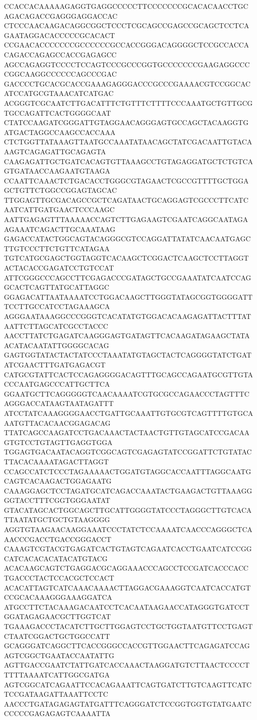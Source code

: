 CCACCACAAAAAGAGGTGAGGCCCCCTTCCCCCCCGCACACAACCTGCAGACAGACCGAGGGAGGACCAC
CTCCCAACAAGACAGGCGGCTCCCTCGCAGCCGAGCCGCAGCTCCTCAGAATAGGACACCCCCGCACACT
CCGAACACCCCCCCGCCCCCCGCCACCGGGACAGGGGCTCCGCCACCACAGACCAGAGCCACCGAGAGCC
AGCCAGAGGTCCCCTCCAGTCCCGCCCGGTGCCCCCCCGAAGAGGCCCCGGCAAGGCCCCCCAGCCCGAC
GACCCCTGCACGCACCGAAAGAGGGACCCGCCCGAAAACGTCCGGCACATCCATGCGTAAACATCATGAC
ACGGGTCGCAATCTTGACATTTCTGTTTCTTTTCCCAAATGCTGTTGCGTGCCAGATTCACTGGGGCAAT
CTATCCAAGATCGGGATTGTAGGAACAGGGAGTGCCAGCTACAAGGTGATGACTAGGCCAAGCCACCAAA
CTCTGGTTATAAAGTTAATGCCAAATATAACAGCTATCGACAATTGTACAAAGTCAGAGATTGCAGAGTA
CAAGAGATTGCTGATCACAGTGTTAAAGCCTGTAGAGGATGCTCTGTCAGTGATAACCAAGAATGTAAGA
CCAATTCAAACTCTGACACCTGGGCGTAGAACTCGCCGTTTTGCTGGAGCTGTTCTGGCCGGAGTAGCAC
TTGGAGTTGCGACAGCCGCTCAGATAACTGCAGGAGTCGCCCTTCATCAATCATTGATGAACTCCCAAGC
AATTGAGAGTTTAAAAACCAGTCTTGAGAAGTCGAATCAGGCAATAGAAGAAATCAGACTTGCAAATAAG
GAGACCATACTGGCAGTACAGGGCGTCCAGGATTATATCAACAATGAGCTTGTCCCTTCTGTTCATAGAA
TGTCATGCGAGCTGGTAGGTCACAAGCTCGGACTCAAGCTCCTTAGGTACTACACCGAGATCCTGTCCAT
ATTCGGGCCCAGCCTTCGAGACCCGATAGCTGCCGAAATATCAATCCAGGCACTCAGTTATGCATTAGGC
GGAGACATTAATAAAATCCTGGACAAGCTTGGGTATAGCGGTGGGGATTTCCTTGCCATCCTAGAAAGCA
AGGGAATAAAGGCCCGGGTCACATATGTGGACACAAGAGATTACTTTATAATTCTTAGCATCGCCTACCC
AACCTTATCTGAGATCAAGGGAGTGATAGTTCACAAGATAGAAGCTATAACATACAATATTGGGGCACAG
GAGTGGTATACTACTATCCCTAAATATGTAGCTACTCAGGGGTATCTGATATCGAACTTTGATGAGACGT
CATGCGTATTCACTCCAGAGGGGACAGTTTGCAGCCAGAATGCGTTGTACCCAATGAGCCCATTGCTTCA
GGAATGCTTCAGGGGGTCAACAAAATCGTGCGCCAGAACCCTAGTTTCAGGGACCATAAGTAATAGATTT
ATCCTATCAAAGGGGAACCTGATTGCAAATTGTGCGTCAGTTTTGTGCAAATGTTACACAACGGAGACAG
TTATCAGCCAAGATCCTGACAAACTACTAACTGTTGTAGCATCCGACAAGTGTCCTGTAGTTGAGGTGGA
TGGAGTGACAATACAGGTCGGCAGTCGAGAGTATCCGGATTCTGTATACTTACACAAAATAGACTTAGGT
CCAGCCATCTCCCTAGAAAAACTGGATGTAGGCACCAATTTAGGCAATGCAGTCACAAGACTGGAGAATG
CAAAGGAGCTCCTAGATGCATCAGACCAAATACTGAAGACTGTTAAAGGGGTACCTTTCGGTGGGAATAT
GTACATAGCACTGGCAGCTTGCATTGGGGTATCCCTAGGGCTTGTCACATTAATATGCTGCTGTAAGGGG
AGGTGTAAGAACAAGGAAATCCCTATCTCCAAAATCAACCCAGGGCTCAAACCCGACCTGACCGGGACCT
CAAAGTCGTACGTGAGATCACTGTAGTCAGAATCACCTGAATCATCCGGCATCACACACATACATGTACG
ACACAAGCAGTCTGAGGACGCAGGAAACCCAGCCTCCGATCACCCACCTGACCCTACTCCACGCTCCACT
ACACATTAGTCATCAAACAAAACTTAGGACGAAAGGTCAATCACCATGTCCGCACAAAGGGAAAGGATCA
ATGCCTTCTACAAAGACAATCCTCACAATAAGAACCATAGGGTGATCCTGGATAGAGAACGCTTGGTCAT
TGAAAGACCCTACATCTTGCTTGGAGTCCTGCTGGTAATGTTCCTGAGTCTAATCGGACTGCTGGCCATT
GCAGGGATCAGGCTTCACCGGGCCACCGTTGGAACTTCAGAGATCCAGAGTCGGCTGAATACCAATATTG
AGTTGACCGAATCTATTGATCACCAAACTAAGGATGTCTTAACTCCCCTTTTTAAAATCATTGGCGATGA
AGTCGGCATCAGAATTCCACAGAAATTCAGTGATCTTGTCAAGTTCATCTCCGATAAGATTAAATTCCTC
AACCCTGATAGAGAGTATGATTTCAGGGATCTCCGGTGGTGTATGAATCCCCCCGAGAGAGTCAAAATTA
